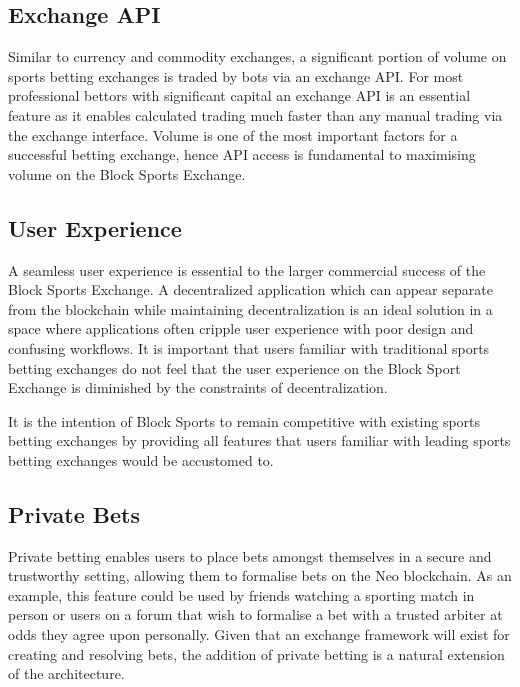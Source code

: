 \documentclass{article}
\begin{document}
	\subsection{Exchange API} \label{exchange-api}
Similar to currency and commodity exchanges, a significant portion of volume on sports betting exchanges is traded by bots via an exchange API. For most professional bettors with significant capital an exchange API is an essential feature as it enables calculated trading much faster than any manual trading via the exchange interface. Volume is one of the most important factors for a successful betting exchange, hence API access is fundamental to maximising volume on the Block Sports Exchange.

	\subsection{User Experience} \label{user-experience}
A seamless user experience is essential to the larger commercial success of the Block Sports Exchange. A decentralized application which can appear separate from the blockchain while maintaining decentralization is an ideal solution in a space where applications often cripple user experience with poor design and confusing workflows. It is important that users familiar with traditional sports betting exchanges do not feel that the user experience on the Block Sport Exchange is diminished by the constraints of decentralization.

It is the intention of Block Sports to remain competitive with existing sports betting exchanges by providing all features that users familiar with leading sports betting exchanges would be accustomed to.

	\subsection{Private Bets} \label{private-bets}
Private betting enables users to place bets amongst themselves in a secure and trustworthy setting, allowing them to formalise bets on the Neo blockchain. As an example, this feature could be used by friends watching a sporting match in person or users on a forum that wish to formalise a bet with a trusted arbiter at odds they agree upon personally. Given that an exchange framework will exist for creating and resolving bets, the addition of private betting is a natural extension of the architecture.
\end{document}
